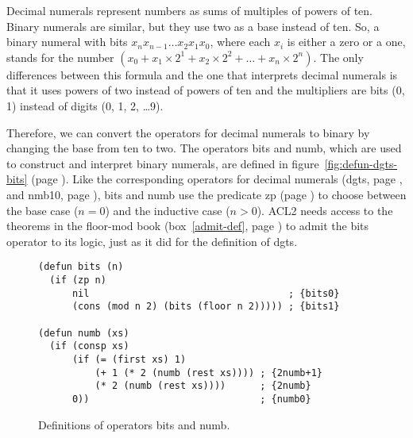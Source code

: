 Decimal numerals represent numbers as sums of multiples of powers of ten.
Binary numerals are similar, but they use two as a base instead of ten.
So, a binary numeral with bits $x_nx_{n-1}\dots x_2x_1x_0$,
where each $x_i$ is either a zero or a one, stands for the number
$(x_0 + x_1 \times 2^1 + x_2 \times 2^2 + \dots + x_{n} \times 2^{n})$.
The only differences between this formula and the one that interprets
decimal numerals is that it uses powers of two instead of
powers of ten and the multipliers are bits (0, 1) instead of
digits (0, 1, 2, \dots 9).

Therefore, we can convert the operators for decimal numerals to binary
by changing the base from ten to two.
The operators \textsf{bits} and \textsf{numb},
which are used to construct and interpret binary numerals,
are defined in
figure~\ref{fig:defun-dgts-bits} (page \pageref{fig:defun-dgts-bits}).
Like the corresponding operators for decimal numerals
(\textsf{dgts}, page \pageref{dgts-defun}, and \textsf{nmb10}, page \pageref{nmb10-defun}),
\textsf{bits} and \textsf{numb} use the predicate \textsf{zp} (page \pageref{zp-def}) to choose
between the base case ($n = 0$) and the inductive case ($n > 0$).
ACL2 needs access to the theorems
in the floor-mod book (box~\ref{admit-def}, page \pageref{admit-def})
to admit the \textsf{bits} operator to its logic,
just as it did for the definition of \textsf{dgts}.

\begin{figure}
\begin{code}
\begin{verbatim}
(defun bits (n)
  (if (zp n)
      nil                                   ; {bits0}
      (cons (mod n 2) (bits (floor n 2))))) ; {bits1}

(defun numb (xs)
  (if (consp xs)
      (if (= (first xs) 1)
          (+ 1 (* 2 (numb (rest xs)))) ; {2numb+1}
          (* 2 (numb (rest xs))))      ; {2numb}
      0))                              ; {numb0}
\end{verbatim}
\end{code}
\caption{Definitions of operators \textsf{bits} and \textsf{numb}.}
\label{fig:defun-dgts-bits}
\label{nmb-defun}
\label{bits-defun}
\end{figure}
	
